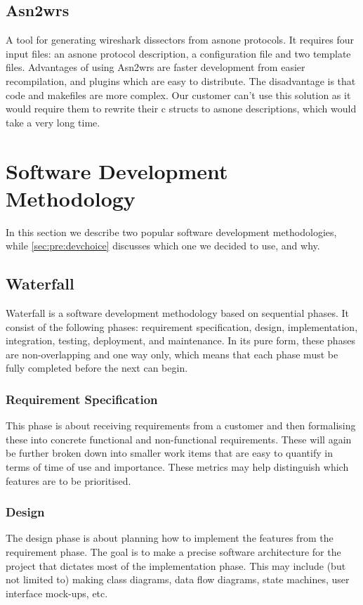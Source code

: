 \subsection{Asn2wrs}
A tool for generating \Gls{wireshark} \glspl{dissector} from \gls{asnone} \glspl{protocol}. It requires
four input files: an \gls{asnone} \gls{protocol} description, a configuration file and two
template files. Advantages of using Asn2wrs are faster development from
easier recompilation, and plugins which are easy to distribute. The disadvantage
is that code and \glspl{makefile} are more complex. Our customer can't use this
solution as it would require them to rewrite their \Gls{c} \glspl{struct} to \gls{asnone}
descriptions, which would take a very long time.


\section{Software Development Methodology}
\label{sec:pre:method}
In this section we describe two popular software development methodologies,
while \autoref{sec:pre:devchoice} discusses which one we decided to use, and
why.

\subsection{Waterfall}
\label{sec:pre:waterfall}
Waterfall is a software development methodology based on sequential phases.
It consist of the following phases: requirement specification, design,
implementation, integration, testing, deployment, and maintenance. In its pure
form, these phases are non-overlapping and one way only, which means that each
phase must be fully completed before the next can begin.

\subsubsection{Requirement Specification}
This phase is about receiving requirements from a customer and then formalising
these into concrete functional and non-functional requirements. These will
again be further broken down into smaller work items that are easy to quantify
in terms of time of use and importance. These metrics may help distinguish
which features are to be prioritised.

\subsubsection{Design}
The design phase is about planning how to implement the features from the
requirement phase. The goal is to make a precise software architecture for the
project that dictates most of the implementation phase. This may include (but
not limited to) making class diagrams, data flow diagrams, state machines, user
interface mock-ups, etc.

